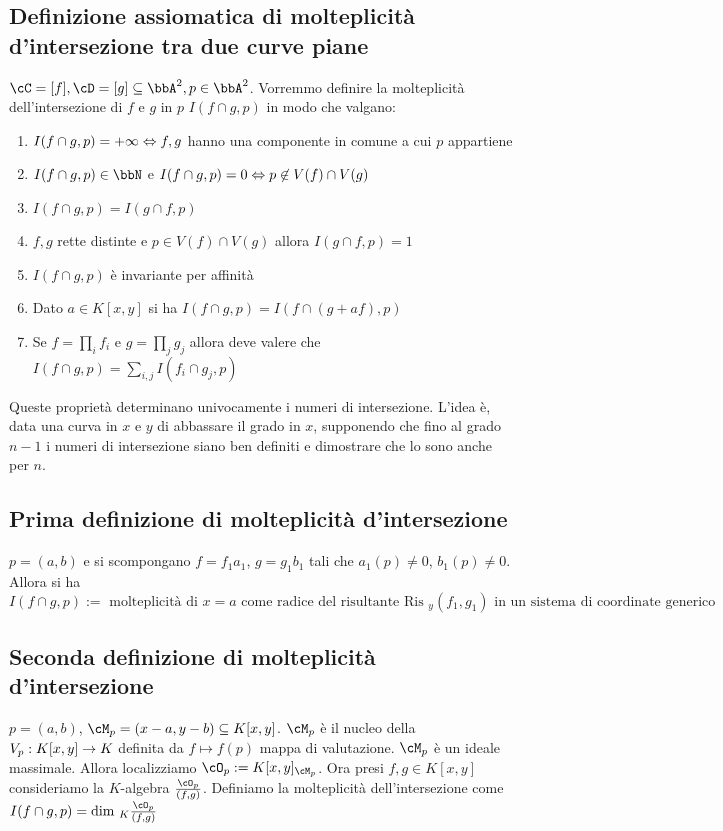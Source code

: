 \documentclass[a4paper,NoNotes,GeneralMath]{stdmdoc}
\begin{document}
	\subsection*{Definizione assiomatica di molteplicità d'intersezione tra due curve piane}
	$\cC = [f], \cD = [g] \subseteq \bbA^2, p \in \bbA^2$. Vorremmo definire la molteplicità dell'intersezione di $f$ e $g$ in $p$ $I(f \cap g, p)$ in modo che valgano:
	\begin{enumerate}
		\item $I(f \cap g, p) = +\infty \Leftrightarrow f,g$ hanno una componente in comune a cui $p$ appartiene
		\item $I(f \cap g, p) \in \bbN$ e $I(f \cap g, p) = 0 \Leftrightarrow p \not\in V(f) \cap V(g)$
		\item $I(f \cap g, p) = I(g \cap f, p)$
		\item $f, g$ rette distinte e $p \in V(f) \cap V(g)$ allora $I(g \cap f, p) = 1$
		\item $I(f \cap g, p)$ è invariante per affinità
		\item Dato $a \in K[x,y]$ si ha $I(f \cap g, p) = I(f \cap (g + af), p)$
		\item Se $f = \prod_i f_i$ e $g = \prod_j g_j$ allora deve valere che $I(f \cap g, p) = \sum_{i,j} I(f_i \cap g_j, p)$
	\end{enumerate}
	Queste proprietà determinano univocamente i numeri di intersezione. L'idea è, data una curva in $x$ e $y$ di abbassare il grado in $x$, supponendo che fino al grado $n-1$ i numeri di intersezione siano ben definiti e dimostrare che lo sono anche per $n$.
	
	\subsection*{Prima definizione di molteplicità d'intersezione}
	$p = (a,b)$ e si scompongano $f = f_1 a_1$, $g = g_1 b_1$ tali che $a_1 (p) \neq 0$, $b_1 (p) \neq 0$. Allora si ha $I(f \cap g, p) := \text{ molteplicità di } x = a \text{ come radice del risultante } \text{Ris }_y(f_1, g_1) \text{ in un sistema di coordinate generico }$
	
	\subsection*{Seconda definizione di molteplicità d'intersezione}
	$p = (a,b)$, $\cM_p = (x-a, y-b) \subseteq K[x,y]$. $\cM_p$ è il nucleo della $V_p: K[x,y] \rightarrow K$ definita da $f \mapsto f(p)$ mappa di valutazione. $\cM_p$ è un ideale massimale. Allora localizziamo $\cO_p := K[x,y]_{\cM_p}$. Ora presi $f, g \in K[x,y]$ consideriamo la $K$-algebra $\frac{\cO_p}{(f,g)}$. Definiamo la molteplicità dell'intersezione come $I(f\cap g, p) = \Dim_K \frac{\cO_p}{(f,g)}$
\end{document}

